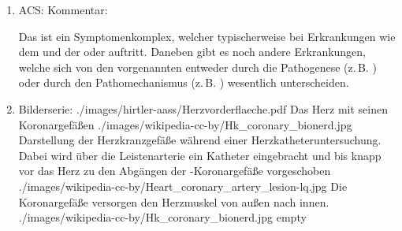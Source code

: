 \documentclass[
ngerman,
paper=a4,
asymmetric,
fontsize=10pt,
headings=small,
draft=false,
numbers=noenddot,
bibtotocnumbered,
footnotes=multiple,
]{scrreprt}
\begin{document}
\begin{enumerate}
{ 
Bei diesen Krankheitsbildern kommt es zu einer akuten  mit Blut und Sauerstoff aufgrund der
Durchblutungsstörung. Die Ursache sind in erster Linie
verengte oder verstopfte Herzkranzgefäße
(,
). Das akute Koronarsyndrom
ist häufig das Ergebnis einer vorbestehenden koronaren Herzkrankheit.
}
{%
\begin{itemize}
  \item Erkrankung der Herzkranzgefäße $\rightarrow$ Verengung
  \item Akutes Koronarsyndrom (ACS)
  \begin{itemize}
    \item Symptomenkomplex
    \item Z.\,B. bei:
    \begin{itemize}
      \item Angina pectoris
      \item Herzinfarkt
    \end{itemize}
  \end{itemize}
\end{itemize}
}
{}
{}
{}
\item ACS: Kommentar:

{
Das
\protect{}
\protect{}
ist ein Symptomenkomplex, welcher
typischerweise bei Erkrankungen wie dem
 und der  oder  auftritt. Daneben gibt es noch andere
Erkrankungen, welche sich von den vorgenannten entweder
durch die Pathogenese (z.\,B. \protect{}) oder
durch den Pathomechanismus (z.\,B. \protect{})
wesentlich unterscheiden.
}
\item 

 \begin{PictureSeriesWide}{}{Bilderserie:
 }
 {./images/hirtler-aass/Herzvorderflaeche.pdf}
 {Das Herz mit seinen Koronargefäßen }
 {./images/wikipedia-cc-by/Hk_coronary_bionerd.jpg}
 {Darstellung der
 Herzkranzgefäße während einer Herzkatheteruntersuchung.
 Dabei wird über die Leistenarterie ein Katheter
 eingebracht und bis knapp vor das Herz zu den Abgängen der
-Koronargefäße vorgeschoben
 }
 {./images/wikipedia-cc-by/Heart_coronary_artery_lesion-lq.jpg}
 {Die Koronargefäße versorgen den
 Herzmuskel von außen nach innen. } {./images/wikipedia-cc-by/Hk_coronary_bionerd.jpg}
 {empty}
 {}
 

\end{PictureSeriesWide}
\end{enumerate}
\end{document}
